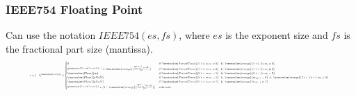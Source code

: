\begin{frame}
    \frametitle{IEEE754 Floating Point}
    Can use the notation $IEEE754(es, fs)$, where $es$ is the exponent size and $fs$ is the fractional part size (mantissa).
\begin{equation}
    \resizebox{0.9\textwidth}{!}{%
    $
    \begin{aligned}
        x&=(-1)^{\textcolor{red}{s}} \times \begin{cases}
                0 &, \text{if } \textcolor{ForestGreen}{\forall\ i<es\ e_i=0}\ \And \textcolor{orange}{\forall\ i<fs\ m_i=0} \\
                2^{\textcolor{ForestGreen}{e}+1} \times \textcolor{orange}{\frac{\sum_{i=0}^{fs-1} m_i \times 2^i}{2^{fs}}} &, \text{if } \textcolor{ForestGreen}{\forall\ i<es\ e_i=0}\ \And \textcolor{orange}{\exists\ i<fs\ m_i\neq0} \\
                \textcolor{Plum}{\infty} &, \text{if } \textcolor{ForestGreen}{\forall\ i<es\ e_i=1}\ \And \textcolor{orange}{\forall\ i<fs\ m_i=0} \\
                 \textcolor{Plum}{sNaN} &, \text{if } \textcolor{ForestGreen}{\forall\ i<es\ e_i=1}\ \And \textcolor{orange}{m_{fs-1}=0} \And \textcolor{orange}{\exists\ i<fs-1\ m_i\neq0} \\
                 \textcolor{Plum}{qNaN} &, \text{if } \textcolor{ForestGreen}{\forall\ i<es\ e_i=1}\ \And \textcolor{orange}{m_{fs-1}=1} \\
                2^{\textcolor{ForestGreen}{e}} \times (1 + \textcolor{orange}{\frac{\sum_{i=0}^{fs-1} m_i \times 2^i}{2^{fs}}}) &, \text{otherwise}
        \end{cases}
    \end{aligned}$%
    }
\end{equation}

\end{frame}



